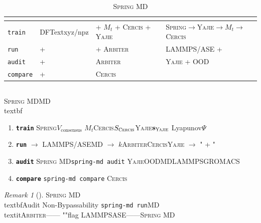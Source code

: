 \documentclass[12pt,a4paper]{article}
\theoremstyle{remark}
\newtheorem{remark}[theorem]{Remark}
\newcommand{\Spring}{\textsc{Spring}}
\newcommand{\Yajie}{\textsc{Yajie}}
\newcommand{\Cercis}{\textsc{Cercis}}
\newcommand{\Arbiter}{\textsc{Arbiter}}
\newcommand{\SpringMD}{\textsc{Spring MD}}
\newcommand{\Lyap}{\ensuremath{\Psi}}
\begin{document}
\begin{table}[H]
\centering
\caption{\SpringMD{}}
\label{tab:commands}
\renewcommand{\arraystretch}{1.5}
\small
\begin{tabular}{@{}p{2.0cm} p{3.2cm} p{3.2cm} p{4.8cm}@{}}
\toprule
\textbf{} & \textbf{} & \textbf{} & \textbf{} \\
\midrule
\texttt{train} &
DFTextxyz/npz&
 + $M_t$ + \Cercis{} +
\Yajie{} &
\Spring{}$\to$\Yajie{}$\to$$M_t$$\to$\Cercis{} \\
\midrule
\texttt{run} &
 +  &
 + \Arbiter{} &
LAMMPS/ASE +  \\
\midrule
\texttt{audit} &
 + &
\Arbiter{} &
\Yajie{} + OOD \\
\midrule
\texttt{compare} &
 +  &
\Cercis{} &
 \\
\bottomrule
\end{tabular}
\end{table}

\subsection{}

\SpringMD{}MD\\textbf{}

\begin{enumerate}[label=\textbf{ \arabic*},leftmargin=*,itemsep=4pt]
    \item \textbf{\texttt{train}}
    \Spring{}$V_{\text{consensus}}$
    $M_t$\Cercis{}$S_{\Cercis}$\Yajie{}$\mathbf{s}_{\Yajie}$
    Lyapunov$\Lyap$

    \item \textbf{\texttt{run}}
    $\to$ LAMMPS/ASEMD $\to$
    $k$\Arbiter{}\Cercis{}\Yajie{} $\to$
    " + "

    \item \textbf{\texttt{audit}}
    \SpringMD{}\texttt{spring-md audit}
    \Yajie{}OODMDLAMMPSGROMACS

    \item \textbf{\texttt{compare}}
    \texttt{spring-md compare}
    \Cercis{}
\end{enumerate}

\begin{remark}[]
\SpringMD{}\\textbf{}Audit Non-Bypassability
\texttt{spring-md run}MD\\textit{}\Arbiter{}——
""flag
LAMMPSASE——\SpringMD{}
\end{remark}

\newpage
\end{document}
